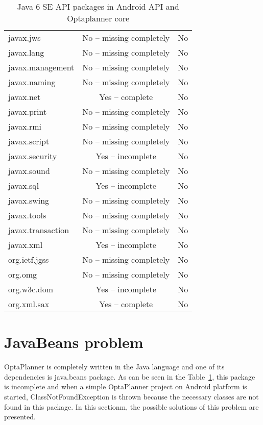 \begin {table}[h!]
\begin{tabular}{|l|c|c|}
javax.jws             & No -- missing completely  & No\\
javax.lang            & No -- missing completely  & No\\
javax.management      & No -- missing completely  & No\\
javax.naming          & No -- missing completely  & No\\
javax.net             & Yes -- complete           & No\\
javax.print           & No -- missing completely  & No\\
javax.rmi             & No -- missing completely  & No\\
javax.script          & No -- missing completely  & No\\
javax.security        & Yes -- incomplete         & No\\
javax.sound           & No -- missing completely  & No\\
javax.sql             & Yes -- incomplete         & No\\
javax.swing           & No -- missing completely  & No\\
javax.tools           & No -- missing completely  & No\\
javax.transaction     & No -- missing completely  & No\\
javax.xml             & Yes -- incomplete         & No\\
org.ietf.jgss         & No -- missing completely  & No\\
org.omg               & No -- missing completely  & No\\
org.w3c.dom           & Yes -- incomplete         & No\\
org.xml.sax           & Yes -- complete           & No\\
\hline
\end{tabular}
\centering
\caption{Java 6 SE API packages in Android API and Optaplanner core}
\label{javaDiff}
\end{table}

\section{JavaBeans problem}\label{JavaBeans}
OptaPlanner is completely written in the Java language and one of its dependencies is java.beans package. As can be seen in the Table~\ref{javaDiff}, this package is incomplete and when a simple OptaPlanner project on Android platform is started, ClassNotFoundException is thrown because the necessary classes are not found in this package. In this sectionm, the possible solutions of this problem are presented.

